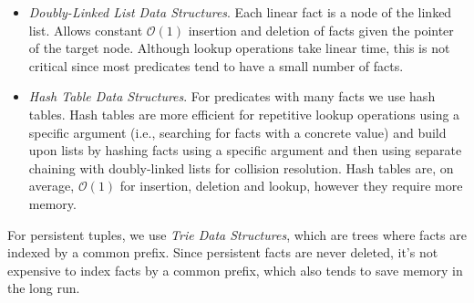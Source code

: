 \begin{itemize}

\item \emph{Doubly-Linked List Data Structures}. Each linear fact is a node of
   the linked list. Allows constant $\mathcal{O}(1)$ insertion and deletion of
   facts given the pointer of the target node. Although lookup operations take
   linear time, this is not critical since most predicates tend to have a small
   number of facts.

\item \emph{Hash Table Data Structures}. For predicates with many facts we use
   hash tables. Hash tables are more efficient for repetitive lookup
   operations using a specific argument (i.e., searching for facts with a
   concrete value) and build upon lists by hashing facts using a
   specific argument and then using separate chaining with doubly-linked lists
   for collision resolution. Hash tables are, on average, $\mathcal{O}(1)$ for
   insertion, deletion and lookup, however they require more memory.

\end{itemize}

For persistent tuples, we use \emph{Trie Data Structures}, which are trees where
facts are indexed by a common prefix. Since persistent facts are never deleted,
it's not expensive to index facts by a common prefix, which also tends to save
memory in the long run.

